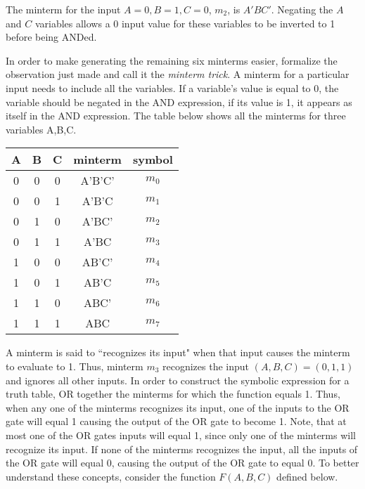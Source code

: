 The minterm
for the input $A=0, B=1, C=0$, $m_2$, is $A'BC'$.  Negating the
$A$ and $C$ variables allows a 0 input value for these variables to 
be inverted to 1 before being ANDed.  

In order to make generating 
the remaining six minterms easier, formalize the observation 
just made and call it the \textit{minterm trick}.  
 \label{page:MinTrick}
A minterm for a particular input needs to include all the variables.
If a variable's value is equal to 0, the variable should be negated in 
the AND expression, if its value is 1, it appears as itself in the
AND expression. The table below shows all the minterms for three 
variables A,B,C.

\begin{tabular}{c|c|c||c|c}
A & B & C & minterm & symbol	\\ \hline
0 & 0 & 0 & A'B'C'  & $m_0$	\\ \hline
0 & 0 & 1 & A'B'C   & $m_1$	\\ \hline
0 & 1 & 0 & A'BC'   & $m_2$	\\ \hline
0 & 1 & 1 & A'BC    & $m_3$	\\ \hline
1 & 0 & 0 & AB'C'   & $m_4$	\\ \hline
1 & 0 & 1 & AB'C    & $m_5$	\\ \hline
1 & 1 & 0 & ABC'    & $m_6$	\\ \hline
1 & 1 & 1 & ABC     & $m_7$	\\ 
\end{tabular}

A minterm is said to ``recognizes its input" when that input
causes the minterm to evaluate to 1.  Thus, minterm $m_3$ recognizes
the input $(A,B,C)=(0,1,1)$ and ignores all other inputs.  In order 
to construct the symbolic expression for a truth table, OR together 
the minterms for which the function equals 1. Thus, when any one of 
the minterms recognizes its input, one of the inputs to the OR gate 
will equal 1 causing the output of the OR gate to become 1.  Note, 
that at most one of the OR gates inputs will equal 1, since only one 
of the minterms will recognize its input.  If none of the minterms 
recognizes the input, all the inputs of the OR gate will equal 0, 
causing the output of the OR gate to equal 0.  To better understand
these concepts, consider the function $F(A,B,C)$ defined below.

